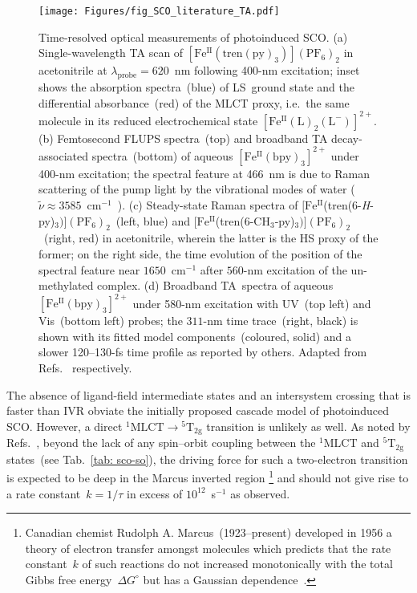 %
\begin{figure}[ht!]
  \centering
  \texttt{[image: Figures/fig\_SCO\_literature\_TA.pdf]}
  \caption[Time-resolved optical measurements of photoinduced SCO.]{
    Time-resolved optical measurements of photoinduced SCO.
    (a) Single-wavelength TA scan of $\mathrm{[Fe^{II}(tren(py)_3)](PF_6)_2}$ in acetonitrile
    at $\lambda_\text{probe} = 620$~nm following 400-nm excitation;
    inset shows the absorption spectra~(blue) of LS~ground state and
    the differential absorbance~(red) of the MLCT proxy,
    i.e.~the same molecule in its reduced electrochemical state
    $\mathrm{[Fe^{II}(L)_2(L^-)]^{2+}}$.
    (b) Femtosecond FLUPS spectra~(top)
    and broadband TA decay-associated spectra~(bottom)
    of aqueous $\mathrm{[Fe^{II}(bpy)_3]^{2+}}$ under 400-nm excitation;
    the spectral feature at 466~nm is due to Raman scattering
    of the pump light by the vibrational modes of water
    ($\tilde{\nu} \approx{} 3585$~cm$^{-1}$~\cite{Harris1978}).
    (c) Steady-state Raman spectra of
    $\mathrm{[Fe^{II}}$(tren(6-\textit{H}-py)$\mathrm{_3)](PF_6)_2}$~(left, blue)
    and $\mathrm{[Fe^{II}}$(tren(6-$\mathrm{CH_3}$-py)$\mathrm{_3)](PF_6)_2}$~(right, red)
    in acetonitrile, wherein the latter is the HS proxy of the former;
    on the right side, the time evolution of the position of the spectral feature near $1650$~cm$^{-1}$
    after $560$-nm excitation of the un-methylated complex.
    (d) Broadband TA~spectra of aqueous $\mathrm{[Fe^{II}(bpy)_3]^{2+}}$
    under 580-nm excitation with UV~(top left) and Vis~(bottom left) probes;
    the $311$-nm time trace~(right, black) is shown with its fitted model components~(coloured, solid)
    and a slower 120--130-fs time profile as reported by others.
    Adapted from Refs.~\cite{Monat2000, Gawelda2007a, Smeigh2008, Aubock2015}
    respectively.
  }
  \label{fig: SCO-literature-TA}
\end{figure}

The absence of ligand-field intermediate states and an intersystem crossing
that is faster than IVR obviate the initially proposed cascade model of photoinduced SCO.
However, a direct $\mathrm{^1 MLCT} \rightarrow{} \mathrm{^5 T_{2g}}$ transition
is unlikely as well.
%
As noted by Refs.~\cite{McCusker2003, SCO-III, Juban2006},
beyond the lack of any spin--orbit coupling between
the $\mathrm{^1 MLCT}$ and $\mathrm{^5 T_{2g}}$ states~(see Tab.~\ref{tab: sco-so}),
the driving force for such a two-electron transition is expected to be
deep in the Marcus inverted region%
\footnote{Canadian chemist Rudolph A. Marcus~(1923--present) developed in 1956
a theory of electron transfer amongst molecules which predicts that
the rate constant~$k$ of such reactions do not increased monotonically with
the total Gibbs free energy~$\Delta{} G^\circ$ but
has a Gaussian dependence~\cite{Nobel1991, Marcus1993}.}
and should not give rise to a rate constant~$k = 1/\tau$ in excess of $10^{12}$~s$^{-1}$
as observed.

